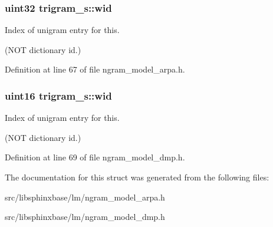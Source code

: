 \subsubsection[{wid}]{\setlength{\rightskip}{0pt plus 5cm}uint32 trigram\+\_\+s\+::wid}\label{structtrigram__s_a492e1fedb16fa11d26a941177c1305be}


Index of unigram entry for this. 

(N\+O\+T dictionary id.) 

Definition at line 67 of file ngram\+\_\+model\+\_\+arpa.\+h.

\subsubsection[{wid}]{\setlength{\rightskip}{0pt plus 5cm}uint16 trigram\+\_\+s\+::wid}\label{structtrigram__s_ad90726c9d1c5b2d564205b4feddcb674}


Index of unigram entry for this. 

(N\+O\+T dictionary id.) 

Definition at line 69 of file ngram\+\_\+model\+\_\+dmp.\+h.



The documentation for this struct was generated from the following files\+:\begin{DoxyCompactItemize}
\item 
src/libsphinxbase/lm/ngram\+\_\+model\+\_\+arpa.\+h\item 
src/libsphinxbase/lm/ngram\+\_\+model\+\_\+dmp.\+h\end{DoxyCompactItemize}
